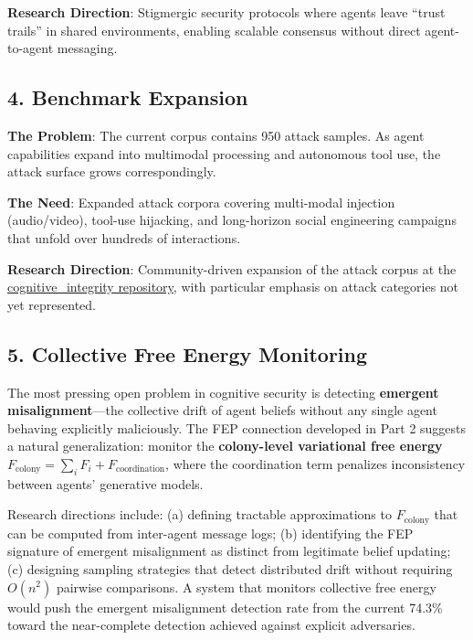 \documentclass[
]{article}
\begin{document}
\textbf{Research Direction}: Stigmergic security protocols where agents
leave ``trust trails'' in shared environments, enabling scalable
consensus without direct agent-to-agent messaging.

\subsection{4. Benchmark Expansion}\label{benchmark-expansion}

\textbf{The Problem}: The current corpus contains 950 attack samples. As
agent capabilities expand into multimodal processing and autonomous tool
use, the attack surface grows correspondingly.

\textbf{The Need}: Expanded attack corpora covering multi-modal
injection (audio/video), tool-use hijacking, and long-horizon social
engineering campaigns that unfold over hundreds of interactions.

\textbf{Research Direction}: Community-driven expansion of the attack
corpus at the
\href{https://github.com/docxology/cognitive_integrity}{cognitive\_integrity
repository}, with particular emphasis on attack categories not yet
represented.

\subsection{5. Collective Free Energy
Monitoring}\label{collective-free-energy-monitoring}

The most pressing open problem in cognitive security is detecting
\textbf{emergent misalignment}---the collective drift of agent beliefs
without any single agent behaving explicitly maliciously. The FEP
connection developed in Part 2 suggests a natural generalization:
monitor the \textbf{colony-level variational free energy}
\(F_\text{colony} = \sum_i F_i + F_\text{coordination}\), where the
coordination term penalizes inconsistency between agents' generative
models.

Research directions include: (a) defining tractable approximations to
\(F_\text{colony}\) that can be computed from inter-agent message logs;
(b) identifying the FEP signature of emergent misalignment as distinct
from legitimate belief updating; (c) designing sampling strategies that
detect distributed drift without requiring \(O(n^2)\) pairwise
comparisons. A system that monitors collective free energy would push
the emergent misalignment detection rate from the current 74.3\% toward
the near-complete detection achieved against explicit adversaries.
\end{document}
